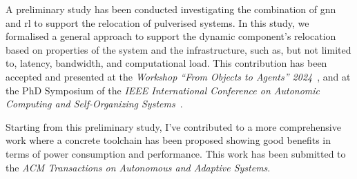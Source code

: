 \documentclass[runningheads]{llncs}
\begin{document}
A preliminary study has been conducted investigating the combination of \ac{gnn} and \ac{rl} to support the relocation of pulverised systems.
%
In this study,
we formalised a general approach to support the dynamic component's relocation based on properties of the system and the infrastructure,
such as, but not limited to,
latency,
bandwidth,
and computational load.
%
This contribution has been accepted and presented at the \emph{Workshop ``From Objects to Agents'' 2024}~\cite{DBLP:conf/woa/DominiFAV24},
and at the PhD Symposium of the \emph{IEEE International Conference on Autonomic Computing and Self-Organizing Systems}~\cite{DBLP:conf/acsos/Farabegoli24}.

Starting from this preliminary study,
I've contributed to a more comprehensive work where a concrete toolchain has been proposed showing good benefits in terms of power consumption and performance.
%
This work has been submitted to the \emph{ACM Transactions on Autonomous and Adaptive Systems}.



\end{document}
